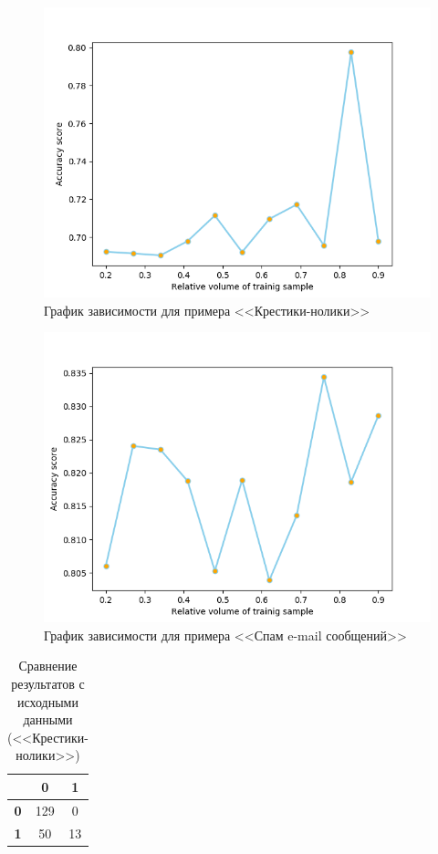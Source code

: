 \documentclass[]{article}
\numberwithin{equation}{section}
\begin{document}
        \begin{figure}[H]
            \centering
            \includegraphics[width = 0.8\linewidth]{data/tic_tac_toe.png}
            \caption{График зависимости для примера <<Крестики-нолики>>}
        \end{figure}

        \begin{figure}[H]
            \centering
            \includegraphics[width = 0.8\linewidth]{data/spam.png}
            \caption{График зависимости для примера <<Спам e-mail сообщений>>}
        \end{figure}

        \begin{table}[H]
            \centering
            \begin{tabular}{|c|c|c|}
              \hline
                & \textbf{0} & \textbf{1} \\
              \hline
              \textbf{0} & 129 & 0\\
              \hline
              \textbf{1} & 50 &  13\\
              \hline
            \end{tabular}
            \caption{Сравнение результатов с исходными данными (<<Крестики-нолики>>)}
        \end{table}
\end{document}
